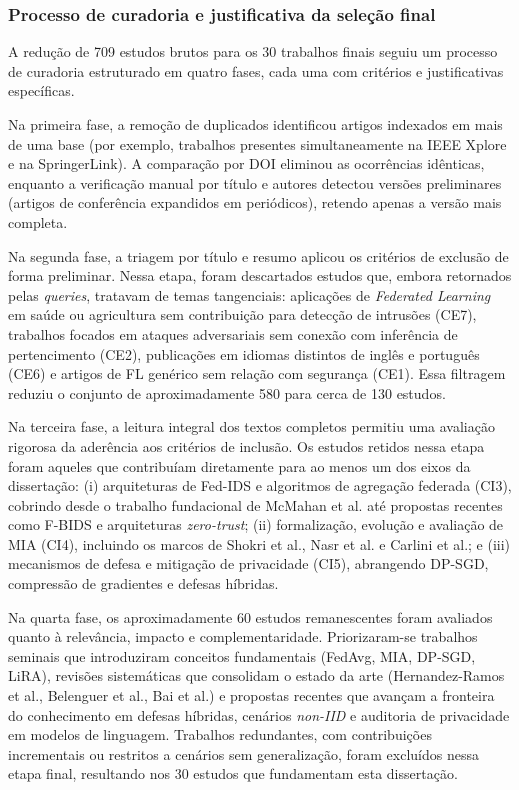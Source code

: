 \documentclass[
	12pt,				%
	openright,			%
	oneside,			%
	a4paper,			%
	english,			%
	french,				%
	spanish,			%
	brazil,				%
	]{abntex2}
\begin{document}
\subsubsection{Processo de curadoria e justificativa da seleção final}

A redução de 709 estudos brutos para os 30 trabalhos finais seguiu um processo de curadoria estruturado em quatro fases, cada uma com critérios e justificativas específicas.

Na primeira fase, a remoção de duplicados identificou artigos indexados em mais de uma base (por exemplo, trabalhos presentes simultaneamente na IEEE Xplore e na SpringerLink). A comparação por DOI eliminou as ocorrências idênticas, enquanto a verificação manual por título e autores detectou versões preliminares (artigos de conferência expandidos em periódicos), retendo apenas a versão mais completa.

Na segunda fase, a triagem por título e resumo aplicou os critérios de exclusão de forma preliminar. Nessa etapa, foram descartados estudos que, embora retornados pelas \textit{queries}, tratavam de temas tangenciais: aplicações de \textit{Federated Learning} em saúde ou agricultura sem contribuição para detecção de intrusões (CE7), trabalhos focados em ataques adversariais sem conexão com inferência de pertencimento (CE2), publicações em idiomas distintos de inglês e português (CE6) e artigos de FL genérico sem relação com segurança (CE1). Essa filtragem reduziu o conjunto de aproximadamente 580 para cerca de 130 estudos.

Na terceira fase, a leitura integral dos textos completos permitiu uma avaliação rigorosa da aderência aos critérios de inclusão. Os estudos retidos nessa etapa foram aqueles que contribuíam diretamente para ao menos um dos eixos da dissertação: (i) arquiteturas de Fed-IDS e algoritmos de agregação federada (CI3), cobrindo desde o trabalho fundacional de McMahan et al. até propostas recentes como F-BIDS e arquiteturas \textit{zero-trust}; (ii) formalização, evolução e avaliação de MIA (CI4), incluindo os marcos de Shokri et al., Nasr et al. e Carlini et al.; e (iii) mecanismos de defesa e mitigação de privacidade (CI5), abrangendo DP-SGD, compressão de gradientes e defesas híbridas.

Na quarta fase, os aproximadamente 60 estudos remanescentes foram avaliados quanto à relevância, impacto e complementaridade. Priorizaram-se trabalhos seminais que introduziram conceitos fundamentais (FedAvg, MIA, DP-SGD, LiRA), revisões sistemáticas que consolidam o estado da arte (Hernandez-Ramos et al., Belenguer et al., Bai et al.) e propostas recentes que avançam a fronteira do conhecimento em defesas híbridas, cenários \textit{non-IID} e auditoria de privacidade em modelos de linguagem. Trabalhos redundantes, com contribuições incrementais ou restritos a cenários sem generalização, foram excluídos nessa etapa final, resultando nos 30 estudos que fundamentam esta dissertação.
\end{document}
